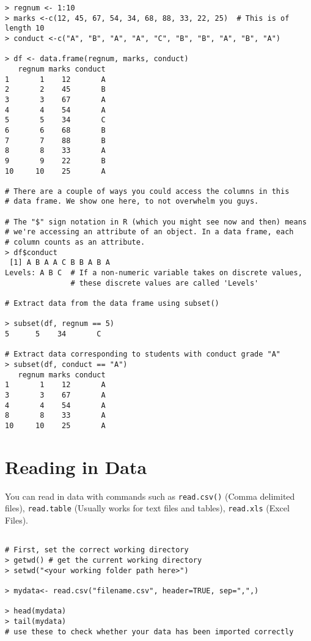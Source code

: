 \documentclass[12pt]{article}
\begin{document}
\begin{itemize}
\begin{verbatim}
> regnum <- 1:10
> marks <-c(12, 45, 67, 54, 34, 68, 88, 33, 22, 25)  # This is of length 10
> conduct <-c("A", "B", "A", "A", "C", "B", "B", "A", "B", "A")

> df <- data.frame(regnum, marks, conduct)
   regnum marks conduct
1       1    12       A
2       2    45       B
3       3    67       A
4       4    54       A
5       5    34       C
6       6    68       B
7       7    88       B
8       8    33       A
9       9    22       B
10     10    25       A

# There are a couple of ways you could access the columns in this
# data frame. We show one here, to not overwhelm you guys.

# The "$" sign notation in R (which you might see now and then) means
# we're accessing an attribute of an object. In a data frame, each
# column counts as an attribute.
> df$conduct
 [1] A B A A C B B A B A
Levels: A B C  # If a non-numeric variable takes on discrete values,
               # these discrete values are called 'Levels'

# Extract data from the data frame using subset()

> subset(df, regnum == 5)
5      5    34       C

# Extract data corresponding to students with conduct grade "A"
> subset(df, conduct == "A")
   regnum marks conduct
1       1    12       A
3       3    67       A
4       4    54       A
8       8    33       A
10     10    25       A

\end{verbatim}

\section{Reading in Data}

You can read in data with commands such as \texttt{read.csv()} (Comma delimited files),
\texttt{read.table} (Usually works for text files and tables), \texttt{read.xls}
(Excel Files).

\begin{verbatim}

# First, set the correct working directory
> getwd() # get the current working directory
> setwd("<your working folder path here>")

> mydata<- read.csv("filename.csv", header=TRUE, sep=",",)

> head(mydata)
> tail(mydata)
# use these to check whether your data has been imported correctly
\end{verbatim}



\end{itemize}
\end{document}
